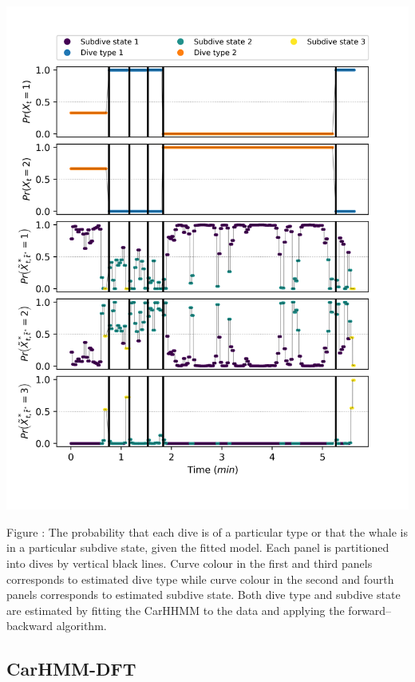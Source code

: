 \documentclass{article}
\begin{document}
        \begin{center}
        \includegraphics[width=6in]{../Plots/2019/20190902-182840-CATs_OB_1_0_267_CarHHMM1_decoded_states.png}
        \end{center}
        
        \noindent Figure : The probability that each dive is of a particular type or that the whale is in a particular subdive state, given the fitted model. Each panel is partitioned into dives by vertical black lines. Curve colour in the first and third panels corresponds to estimated dive type while curve colour in the second and fourth panels corresponds to estimated subdive state. Both dive type and subdive state are estimated by fitting the CarHHMM to the data and applying the forward--backward algorithm.
        \addtocounter{fignum}{1}
        
        \subsection{CarHMM-DFT}
        
\end{document}
